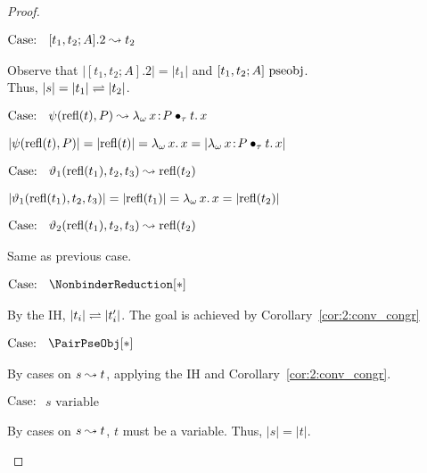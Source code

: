 \begin{proof}
\begin{proofcase}
        $\text{Case: }\begin{array}{c} [t_1, t_2; A].2 \leadsto t_2 \end{array}$
        \begin{proofcase}
            Observe that $|[t_1, t_2; A].2| = |t_1|$ and $[t_1, t_2; A]~\mbox{\normalfont pseobj}$. \\
            Thus, $|s| = |t_1| \rightleftharpoons |t_2|$.
        \end{proofcase}

        $\text{Case: }\begin{array}{c} \psi(\text{refl}(t),P) \leadsto {\lambda_\omega}\, x\! : \! P \bullet_{\tau} t.\, x \end{array}$
        \begin{proofcase}
            $|\psi(\text{refl}(t),P)| = |\text{refl}(t)| = {\lambda_\omega}\, x.\, x = |{\lambda_\omega}\, x\! : \! P \bullet_{\tau} t.\, x|$
        \end{proofcase}

        $\text{Case: }\begin{array}{c} \vartheta_1(\text{refl}(t_1), t_2, t_3) \leadsto \text{refl}(t_2) \end{array}$
        \begin{proofcase}
            $|\vartheta_1(\text{refl}(t_1), t_2, t_3)| = |\text{refl}(t_1)| = {\lambda_\omega}\, x.\, x = |\text{refl}(t_2)|$
        \end{proofcase}

        $\text{Case: }\begin{array}{c} \vartheta_2(\text{refl}(t_1), t_2, t_3) \leadsto \text{refl}(t_2) \end{array}$
        \begin{proofcase}
            Same as previous case.
        \end{proofcase}

        $\text{Case: }\begin{array}{c} \NonbinderReduction[*] \end{array}$
        \begin{proofcase}
            By the IH, $|t_i| \rightleftharpoons |t_i^\prime|$. The goal is achieved by Corollary~\ref{cor:2:conv_congr}
        \end{proofcase}

    \end{proofcase}

    $\text{Case: }\begin{array}{c} \PairPseObj[*] \end{array}$
    \begin{proofcase}
        By cases on $s \leadsto t$, applying the IH and Corollary~\ref{cor:2:conv_congr}.
    \end{proofcase}

    $\text{Case: }\begin{array}{c} s\text{ variable} \end{array}$
    \begin{proofcase}
        By cases on $s \leadsto t$, $t$ must be a variable.
        Thus, $|s| = |t|$.
    \end{proofcase}
\end{proof}

